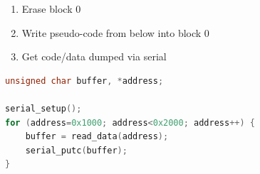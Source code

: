 \documentclass[aspectratio=169]{beamer}
\begin{document}
\begin{frame}[fragile]
\begin{columns}
\begin{column}{0.2\textwidth}
		\end{column}
		\begin{column}{0.8\textwidth}
			\begin{enumerate}
				\item Erase block 0
				\item Write pseudo-code from below into block 0
				\item Get code/data dumped via serial
			\end{enumerate}

			\vspace{1cm}

\begin{scriptsize}
\begin{lstlisting}[frame=single,language=C,commentstyle=\color{commentsColor}\textit,keywordstyle=\color{keywordsColor}\bfseries,stringstyle=\color{stringColor}]
unsigned char buffer, *address;

serial_setup();
for (address=0x1000; address<0x2000; address++) {
    buffer = read_data(address);
    serial_putc(buffer);
}
\end{lstlisting}
\end{scriptsize}

		\end{column}
	\end{columns}

\end{frame}
\end{document}
